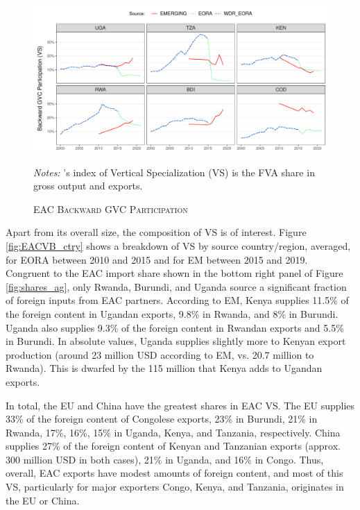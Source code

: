 \documentclass[a4paper]{article}
\begin{document}
\begin{figure}[h!] 
\centering
\caption{\label{fig:EACVB_ag_ts}\textsc{EAC Backward GVC Participation}}
\includegraphics[width=1\textwidth, trim= {0 0 0 0}, clip]{"Figures/VA_shares_ag_ts.pdf"} \raggedright
\scriptsize
\emph{Notes:} \citet{hummels2001nature}'s index of Vertical Specialization (VS) is the FVA share in gross output and exports. 
\end{figure}
\FloatBarrier

Apart from its overall size, the composition of VS is of interest. Figure \ref{fig:EACVB_ctry} shows a breakdown of VS by source country/region, averaged, for EORA between 2010 and 2015 and for EM between 2015 and 2019. Congruent to the EAC import share shown in the bottom right panel of Figure \ref{fig:shares_ag}, only Rwanda, Burundi, and Uganda source a significant fraction of foreign inputs from EAC partners. According to EM, Kenya supplies 11.5\% of the foreign content in Ugandan exports, 9.8\% in Rwanda, and 8\% in Burundi. Uganda also supplies 9.3\% of the foreign content in Rwandan exports and 5.5\% in Burundi. In absolute values, Uganda supplies slightly more to Kenyan export production (around 23 million USD according to EM, vs. 20.7 million to Rwanda). This is dwarfed by the 115 million that Kenya adds to Ugandan exports. \newline 

In total, the EU and China have the greatest shares in EAC VS. The EU supplies 33\% of the foreign content of Congolese exports, 23\% in Burundi, 21\% in Rwanda, 17\%, 16\%, 15\% in Uganda, Kenya, and Tanzania, respectively. China supplies 27\% of the foreign content of Kenyan and Tanzanian exports (approx. 300 million USD in both cases), 21\% in Uganda, and 16\% in Congo. Thus, overall, EAC exports have modest amounts of foreign content, and most of this VS, particularly for major exporters Congo, Kenya, and Tanzania, originates in the EU or China. 
\end{document}
